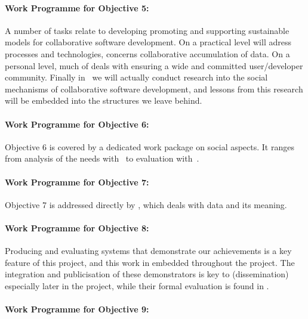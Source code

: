\paragraph{Work Programme for Objective 5: }

A number of tasks relate to developing promoting and supporting
sustainable models for collaborative software development. On a
practical level  will adress
processes and technologies,  concerns
collaborative accumulation of data. On a personal level, much of
 deals with ensuring a wide and committed user/developer
community. Finally in~
we will actually conduct research into the social mechanisms of
collaborative software development, and lessons from this research
will be embedded into the structures we leave behind.

\paragraph{Work Programme for Objective 6: }

Objective 6 is covered by a dedicated work package  on social aspects.
It ranges from analysis of the needs with~ to
evaluation with~.

\paragraph{Work Programme for Objective 7: }

Objective 7 is addressed directly by , which deals with data
and its meaning.

\paragraph{Work Programme for Objective 8: }

Producing and evaluating systems that demonstrate our achievements is
a key feature of this project, and this work in embedded throughout
the project. The integration and publicisation of these demonstrators
is key to  (dissemination) especially later in the
project, while their formal evaluation is found in .

\paragraph{Work Programme for Objective 9: }

